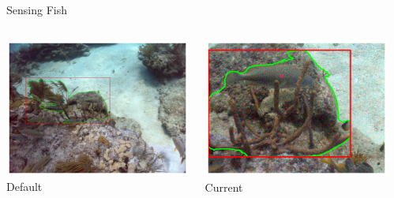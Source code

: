 \begin{frame}{Sensing Fish}
    \begin{columns}
        \begin{column}{0.33\textwidth}
            \includegraphics[width=\linewidth,keepaspectratio]{images/original.png}
            {\small Default}
        \end{column}
        \begin{column}{0.33\textwidth}
            \includegraphics[width=\linewidth,keepaspectratio]{images/current.png}
            {\small Current}
        \end{column}
        \begin{column}{0.33\textwidth}

\end{column}
\end{columns}
\end{frame}
